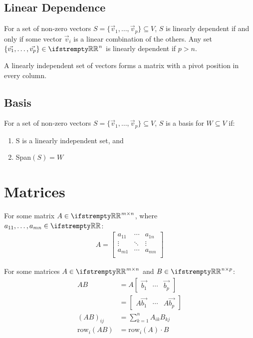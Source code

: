 \documentclass[12pt, a4paper]{article}
\begin{document}
\begin{multicols*}{3}
\subsection{Linear Dependence}
For a set of non-zero vectors  $S = \{\vec{v}_1,\ldots,\vec{v}_p\} \subseteq V$, $S$ is linearly dependent if and only if some vector $\vec{v}_i$ is a linear combination of the others. Any set $\{\vec{v_1},\ldots,\vec{v_p}\} \in \RR^n$ is linearly dependent if $p>n$.

A linearly independent set of vectors forms a matrix with a pivot position in every column.

\subsection{Basis}
For a set of non-zero vectors  $S = \{\vec{v}_1,\ldots,\vec{v}_p\} \subseteq V$, $S$ is a basis for $W \subseteq V$ if:
\begin{enumerate}[\roman*.]
  \item S is a linearly independent set, and
  \item Span$(S) = W$
\end{enumerate}

\colbreak

\section{Matrices}
For some matrix $A \in \RR^{m{\times}n}$, where $a_{11},\ldots,a_{mn} \in \RR$:
\begin{align*}
  A = \begin{bmatrix}
    a_{11} & \cdots & a_{1n} \\
    \vdots & \ddots & \vdots \\
    a_{m1} & \cdots & a_{mn} \\
  \end{bmatrix}
\end{align*}

For some matrices $A \in \RR^{m{\times}n}$ and $B \in \RR^{n{\times}p}$:
\begin{align*}
  AB &= A\begin{bmatrix}\vec{b_1} & \cdots & \vec{b_p}\end{bmatrix} \\
                                 &= \begin{bmatrix}A\vec{b_1} & \cdots & A\vec{b_p}\end{bmatrix} \\ 
  (AB)_{ij} &= \sum^n_{k=1}A_{ik}B_{kj} \\
  \text{row}_i(AB) &= \text{row}_i(A){\cdot}B
\end{align*}


\end{multicols*}
\end{document}
